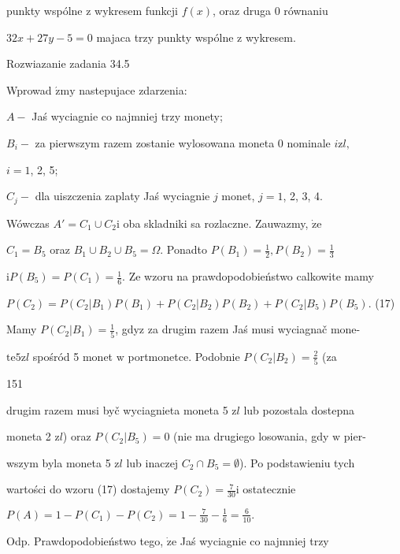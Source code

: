 \documentclass[a4paper,12pt]{article}
\begin{document}
punkty wspólne $\mathrm{z}$ wykresem funkcji $f(x)$, oraz druga $0$ równaniu

$32x+27y-5=0$ majaca trzy punkty wspólne $\mathrm{z}$ wykresem.

Rozwiazanie zadania 34.5

Wprowad $\acute{\mathrm{z}}\mathrm{m}\mathrm{y}$ nastepujace zdarzenia:

$A-$ Jaś wyciagnie co najmniej trzy monety;

$B_{i}-$ za pierwszym razem zostanie wylosowana moneta $0$ nominale $i \mathrm{z}l,$

$i=1$, 2, 5;

$C_{j}-$ dla uiszczenia zaplaty Jaś wyciagnie $j$ monet, $j=1$, 2, 3, 4.

Wówczas $A' = C_{1}\cup C_{2} \mathrm{i}$ oba skladniki sa rozlaczne. Zauwazmy, $\dot{\mathrm{z}}\mathrm{e}$

$C_{1} = B_{5}$ oraz $B_{1}\cup B_{2}\cup B_{5} = \Omega$. Ponadto $P(B_{1}) = \displaystyle \frac{1}{2}, P(B_{2}) = \displaystyle \frac{1}{3}$

$\displaystyle \mathrm{i}P(B_{5})=P(C_{1})=\frac{1}{6}$. Ze wzoru na prawdopodobieństwo calkowite mamy

$P(C_{2})=P(C_{2}|B_{1})P(B_{1})+P(C_{2}|B_{2})P(B_{2})+P(C_{2}|B_{5})P(B_{5})$.   (17)

Mamy $P(C_{2}|B_{1})=\displaystyle \frac{1}{5}$, gdyz za drugim razem Jaś musi wyciagnač mone-

$\mathrm{t}\mathrm{e} 5 \mathrm{z}l$ spośród 5 monet $\mathrm{w}$ portmonetce. Podobnie $P(C_{2}|B_{2}) = \displaystyle \frac{2}{5}$ (za





151

drugim razem musi byč wyciagnieta moneta 5 $\mathrm{z}l$ lub pozostala dostepna

moneta 2 $\mathrm{z}l$) oraz $P(C_{2}|B_{5}) =0$ (nie ma drugiego losowania, gdy $\mathrm{w}$ pier-

wszym byla moneta 5 $\mathrm{z}l$ lub inaczej $ C_{2}\cap B_{5}=\emptyset$). Po podstawieniu tych

wartości do wzoru (17) dostajemy $P(C_{2})=\displaystyle \frac{7}{30}\mathrm{i}$ ostatecznie

$P(A)=1-P(C_{1})-P(C_{2})=1-\displaystyle \frac{7}{30}-\frac{1}{6}=\frac{6}{10}.$

Odp. Prawdopodobieństwo tego, $\dot{\mathrm{z}}\mathrm{e}$ Jaś wyciagnie co najmniej trzy
\end{document}
